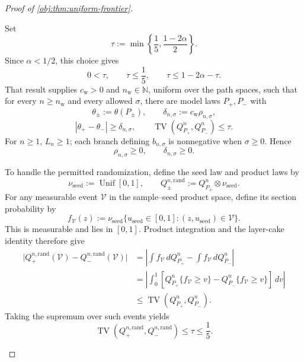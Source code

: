 \documentclass[11pt]{article}
\begin{document}
\begin{proof}[Proof of \cref{obj:thm:uniform-frontier}]
\begin{enumerate}
Set
\[
\tau:=\min\left\{\frac15,\frac{1-2\alpha}{2}\right\}.
\]
Since \(\alpha<1/2\), this choice gives
\[
0<\tau,\qquad \tau\le\frac15,\qquad
\tau\le1-2\alpha-\tau.
\]
That result supplies \(c_{\mathrm w}>0\) and \(n_{\mathrm w}\in\mathbb N\), uniform over the path spaces, such that for every \(n\ge n_{\mathrm w}\) and every allowed \(\sigma\), there are model laws \(P_+,P_-\) with
\[
\theta_\pm:=\theta(P_\pm),\qquad
\delta_{n,\sigma}:=c_{\mathrm w}\rho_{n,\sigma},
\]
\[
|\theta_+-\theta_-|\ge\delta_{n,\sigma},
\qquad
\operatorname{TV}(Q_{P_+}^n,Q_{P_-}^n)\le\tau.
\]
For \(n\ge1\), \(L_n\ge1\); each branch defining \(b_{n,\sigma}\) is nonnegative when \(\sigma\ge0\). Hence
\[
\rho_{n,\sigma}\ge0,\qquad \delta_{n,\sigma}\ge0.
\]

To handle the permitted randomization, define the seed law and product laws by
\[
\nu_{\mathrm{seed}}:=\operatorname{Unif}[0,1],
\qquad
Q_\pm^{n,\mathrm{rand}}:=Q_{P_\pm}^n\otimes\nu_{\mathrm{seed}}.
\]
For any measurable event \(\mathcal V\) in the sample--seed product space, define its section probability by
\[
f_{\mathcal V}(z)
:=
\nu_{\mathrm{seed}}\{u_{\mathrm{seed}}\in[0,1]:
(z,u_{\mathrm{seed}})\in\mathcal V\}.
\]
This is measurable and lies in \([0,1]\). Product integration and the layer-cake identity therefore give
\[
\begin{aligned}
\bigl|Q_+^{n,\mathrm{rand}}(\mathcal V)
      -Q_-^{n,\mathrm{rand}}(\mathcal V)\bigr|
&=
\left|\int f_{\mathcal V}\,dQ_{P_+}^n
      -\int f_{\mathcal V}\,dQ_{P_-}^n\right|\\
&=
\left|\int_0^1
\left[
Q_{P_+}^n\{f_{\mathcal V}\ge v\}
-
Q_{P_-}^n\{f_{\mathcal V}\ge v\}
\right]\,dv\right|\\
&\le \operatorname{TV}(Q_{P_+}^n,Q_{P_-}^n).
\end{aligned}
\]
Taking the supremum over such events yields
\[
\operatorname{TV}(Q_+^{n,\mathrm{rand}},Q_-^{n,\mathrm{rand}})
\le\tau\le\frac15.
\]


\end{enumerate}
\end{proof}
\end{document}
